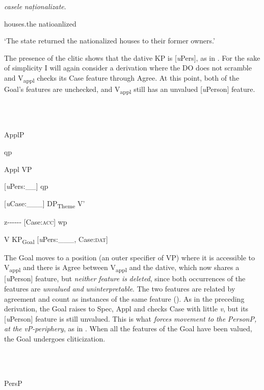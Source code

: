 \documentclass[output=paper,colorlinks,citecolor=brown]{./langscibook}
\begin{document}
\textit{casele}     \textit{naționalizate}.

houses.the  natioanlized

  ‘The state returned the nationalized houses to their former owners.’

The presence of the clitic shows that the dative KP is [\textit{u}Pers], as in . For the sake of simplicity I will again consider a derivation where the DO does not scramble and V\textsubscript{appl} checks its Case feature through Agree. At this point, both of the Goal’s features are unchecked, and V\textsubscript{appl} still has an unvalued [\textit{u}Person] feature.

\ea%
    \label{ex:key:35}
    \gll\\
        \\
    \glt
    \z

              ApplP

qp

  Appl        VP

[\textit{u}Pers:\_\_]                        qp

[\textit{u}Case:\_\_\_]    DP\textsubscript{Theme}    V’

  z-{}-{}-{}-{}-{}- [Case:\textsc{acc}]    wp

V      KP\textsubscript{Goal} [\textit{u}Pers:\_\_\_, Case:\textsc{dat}]

The Goal moves to a position (an outer specifier of VP) where it is accessible to V\textsubscript{appl} and there is Agree between V\textsubscript{appl} and the dative, which now shares a [\textit{u}Person] feature, but \textit{neither} \textit{feature} \textit{is} \textit{deleted}, since both occurrences of the features are \textit{unvalued} \textit{and} \textit{uninterpretable}. The two features are related by agreement and count as instances of the same feature (\citealt{PesetskyTorrego2007}). As in the preceding derivation, the Goal raises to Spec, Appl and checks Case with little \textit{v}, but its [\textit{u}Person] feature is still unvalued. This is what \textit{forces} \textit{movement} \textit{to} \textit{the} \textit{PersonP,} \textit{at} \textit{the} \textit{vP-periphery}, as in . When all the features of the Goal have been valued, the Goal undergoes cliticization.

\ea%
    \label{ex:key:36}
    \gll\\
        \\
    \glt
    \z

          PersP
\end{document}
